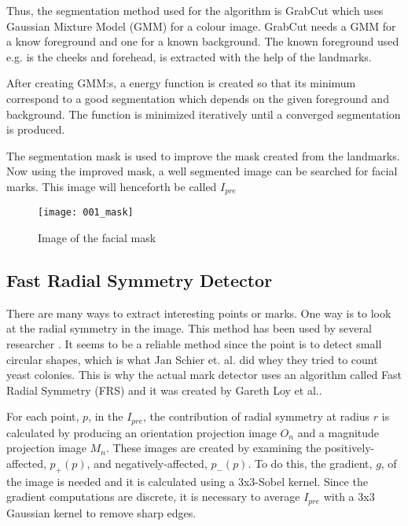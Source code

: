 Thus, the segmentation method used for the algorithm is GrabCut which uses Gaussian Mixture Model (GMM) for a colour image. GrabCut needs a GMM for a know foreground and one for a known background. The known foreground used e.g. is the cheeks and forehead, is extracted with the help of the landmarks. 

After creating GMM:s, a energy function is created so that its minimum correspond to a good segmentation which depends on the given foreground and background. The function is minimized iteratively until a converged segmentation is produced.

The segmentation mask is used to improve the mask created from the landmarks. Now using the improved mask, a well segmented image can be searched for facial marks. This image will henceforth be called \textit{$I_{pre}$}

\begin{figure}[h!]
	\centering
	\texttt{[image: 001\_mask]}
	\caption{Image of the facial mask \label{fig:mask_img}}
\end{figure}



\subsection{Fast Radial Symmetry Detector}

There are many ways to extract interesting points or marks. One way is to look at the radial symmetry in the image. This method has been used by several researcher \cite{twins,FRS,automatic_detector_2015,yeast}. It seems to be a reliable method since the point is to detect small circular shapes, which is what Jan Schier et. al.\cite{yeast} did whey they tried to count yeast colonies. This is why the actual mark detector uses an algorithm called Fast Radial Symmetry (FRS) and it was created by Gareth Loy et al.\cite{FRS}. 

For each point, $p$, in the \textit{$I_{pre}$}, the contribution of radial symmetry at radius $r$ is calculated by producing an orientation projection image $O_n$ and a magnitude projection image $M_n$. These images are created by examining the positively-affected, $p_{+}(p)$, and negatively-affected, $p_{-}(p)$. To do this, the gradient, $g$, of the image is needed and it is calculated using a 3x3-Sobel kernel. Since the gradient computations are discrete, it is necessary to average \textit{$I_{pre}$} with a 3x3 Gaussian kernel to remove sharp edges. 

